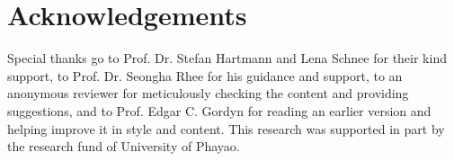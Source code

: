 \documentclass[output=paper,colorlinks,citecolor=brown]{langscibook}
\begin{document}
\section*{Acknowledgements}
Special thanks go to Prof. Dr. Stefan Hartmann and Lena Schnee for their kind support, to Prof. Dr. Seongha Rhee for his guidance and support, to an anonymous reviewer for meticulously checking the content and providing suggestions, and to Prof. Edgar C. Gordyn for reading an earlier version and helping improve it in style and content. This research was supported in part by the research fund of University of Phayao.

\sloppy
\printbibliography[heading=subbibliography,notkeyword=this]
\end{document}
